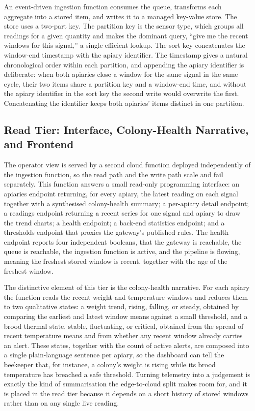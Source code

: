 \documentclass[conference]{IEEEtran}
\begin{document}
An event-driven ingestion function consumes the queue, transforms each aggregate into a stored item, and writes it to a managed key-value store. The store uses a two-part key. The partition key is the sensor type, which groups all readings for a given quantity and makes the dominant query, ``give me the recent windows for this signal,'' a single efficient lookup. The sort key concatenates the window-end timestamp with the apiary identifier. The timestamp gives a natural chronological order within each partition, and appending the apiary identifier is deliberate: when both apiaries close a window for the same signal in the same cycle, their two items share a partition key and a window-end time, and without the apiary identifier in the sort key the second write would overwrite the first. Concatenating the identifier keeps both apiaries' items distinct in one partition.

\subsection{Read Tier: Interface, Colony-Health Narrative, and Frontend}

The operator view is served by a second cloud function deployed independently of the ingestion function, so the read path and the write path scale and fail separately. This function answers a small read-only programming interface: an apiaries endpoint returning, for every apiary, the latest reading on each signal together with a synthesised colony-health summary; a per-apiary detail endpoint; a readings endpoint returning a recent series for one signal and apiary to draw the trend charts; a health endpoint; a back-end statistics endpoint; and a thresholds endpoint that proxies the gateway's published rules. The health endpoint reports four independent booleans, that the gateway is reachable, the queue is reachable, the ingestion function is active, and the pipeline is flowing, meaning the freshest stored window is recent, together with the age of the freshest window.

The distinctive element of this tier is the colony-health narrative. For each apiary the function reads the recent weight and temperature windows and reduces them to two qualitative states: a weight trend, rising, falling, or steady, obtained by comparing the earliest and latest window means against a small threshold, and a brood thermal state, stable, fluctuating, or critical, obtained from the spread of recent temperature means and from whether any recent window already carries an alert. These states, together with the count of active alerts, are composed into a single plain-language sentence per apiary, so the dashboard can tell the beekeeper that, for instance, a colony's weight is rising while its brood temperature has breached a safe threshold. Turning telemetry into a judgement is exactly the kind of summarisation the edge-to-cloud split makes room for, and it is placed in the read tier because it depends on a short history of stored windows rather than on any single live reading.
\end{document}

